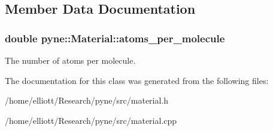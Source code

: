 \subsection{Member Data Documentation}
\hypertarget{classpyne_1_1_material_a7ddff1aaebc94bcda22d3422c093a756}{
\subsubsection[{atoms\-\_\-per\-\_\-molecule}]{\setlength{\rightskip}{0pt plus 5cm}double pyne\-::\-Material\-::atoms\-\_\-per\-\_\-molecule}}\label{classpyne_1_1_material_a7ddff1aaebc94bcda22d3422c093a756}
The number of atoms per molecule. 

The documentation for this class was generated from the following files\-:\begin{DoxyCompactItemize}
\item 
/home/elliott/\-Research/pyne/src/material.\-h\item 
/home/elliott/\-Research/pyne/src/material.\-cpp\end{DoxyCompactItemize}
